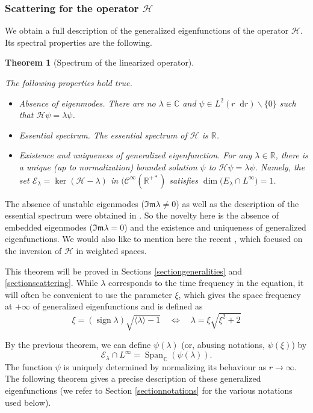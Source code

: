 \documentclass[11 pt]{amsart}
\newtheorem{thm}{Theorem}[section]
\theoremstyle{definition}
\theoremstyle{remark}
\numberwithin{equation}{section}
\newcommand{\dd}{\mathop{}\!\mathrm{d}}
\begin{document}
\subsubsection{Scattering for the operator $\mathcal{H}$}
We obtain a full description of the generalized eigenfunctions of the operator $\mathcal{H}$. Its spectral properties are the following.

\begin{thm}[Spectrum of the linearized operator]
  \label{bug}

The following properties hold true.
\begin{itemize}
\item \emph{Absence of eigenmodes}. There are no $\lambda \in \mathbb C$ and $\psi \in L^2(r\dd r)\backslash \{0\}$ such that $\mathcal H \psi=\lambda \psi$. 
\item \emph{Essential spectrum}. The essential spectrum of $\mathcal H$ is $\mathbb R$.
\item \emph{Existence and uniqueness of generalized eigenfunction}. For any $\lambda \in \mathbb{R}$, there is a unique (up to normalization) bounded solution $\psi$ to $\mathcal H\psi=\lambda \psi$. Namely, the set $\mathcal{E}_{\lambda} = \ker(\mathcal{H}- \lambda)$ in $(\mathcal{C}^{\infty} (\mathbb{R}^{+ \ast})$ satisfies $\dim \mathcal({E}_\lambda \cap L^\infty) = 1$.
\end{itemize}
\end{thm}

The absence of unstable eigenmodes ($\mathfrak{Im} \lambda \neq 0$) as well as the description of the essential spectrum were obtained in \cite{WeinsteinXin}. So the novelty here is the absence of embedded eigenmodes ($\mathfrak{Im} \lambda =0$) and the existence and uniqueness of generalized eigenfunctions. We would also like to mention here the recent \cite{DPJM}, which focused on the inversion of $\mathcal{H}$ in weighted spaces.

This theorem will be proved in Sections \ref{sectiongeneralities} and \ref{sectionscattering}.
While $\lambda$ corresponds to the time frequency in the equation, it will often be convenient to use the parameter $\xi$, which gives the space frequency at $+ \infty$ of generalized eigenfunctions and is defined as
\[ \xi = (\operatorname{sign} \lambda) \sqrt {\langle \lambda \rangle - 1} \quad \Longleftrightarrow \quad \lambda = \xi \sqrt{\xi^2 +2} \]

By the previous theorem, we can define $\psi(\lambda)$ (or, abusing notations, $\psi(\xi)$) by
$$
\mathcal{E}_\lambda \cap L^\infty = \operatorname{Span}_{\mathbb{C}} (\psi(\lambda)).
$$
The function $\psi$ is uniquely determined by normalizing its behaviour as $r\to \infty$. The following theorem gives a precise description of these generalized eigenfunctions (we refer to Section \ref{sectionnotations} for the various notations used below).
\end{document}
